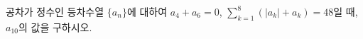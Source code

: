 공차가 정수인 등차수열 $\{a_n\}$에 대하여 $a_4+a_6=0$, $\displaystyle\sum_{k=1}^{8}(|a_k|+a_k)=48$일 때, $a_{10}$의 값을 구하시오.
